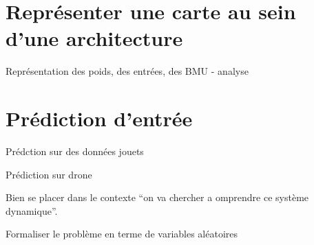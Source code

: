\section{Représenter une carte au sein d'une architecture}

Représentation des poids, des entrées, des BMU - analyse

\section{Prédiction d'entrée}

Prédction sur des données jouets

Prédiction sur drone



Bien se placer dans le contexte “on va chercher a omprendre ce système dynamique”.

Formaliser le problème en terme de variables aléatoires